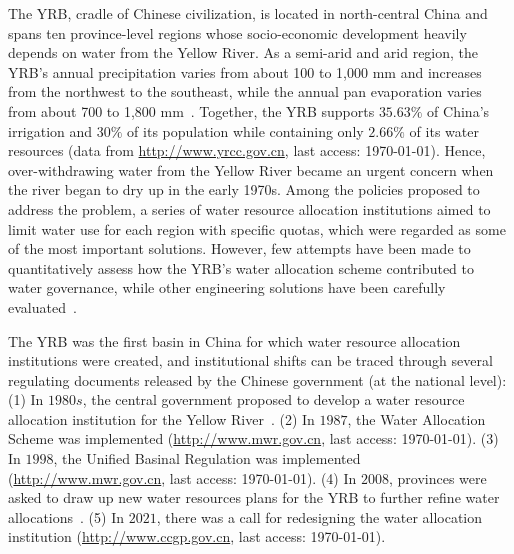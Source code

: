 
The YRB, cradle of Chinese civilization, is located in north-central China and spans ten province-level regions whose socio-economic development heavily depends on water from the Yellow River.
As a semi-arid and arid region, the YRB's annual precipitation varies from about 100 to 1,000 mm and increases from the northwest to the southeast, while the annual pan evaporation varies from about 700 to 1,800 mm~\cite{wang2022e}.
Together, the YRB supports $35.63\%$ of China's irrigation and $30\%$ of its population while containing only $2.66\%$ of its water resources (data from \href{http://www.yrcc.gov.cn}{http://www.yrcc.gov.cn}, last access: \today).
Hence, over-withdrawing water from the Yellow River became an urgent concern when the river began to dry up in the early 1970s.
Among the policies proposed to address the problem, a series of water resource allocation institutions aimed to limit water use for each region with specific quotas, which were regarded as some of the most important solutions.
However, few attempts have been made to quantitatively assess how the YRB's water allocation scheme contributed to water governance, while other engineering solutions have been carefully evaluated~\cite{long2020}.


The YRB was the first basin in China for which water resource allocation institutions were created, and institutional shifts can be traced through several regulating documents released by the Chinese government (at the national level):
(1) In $1980s$, the central government proposed to develop a water resource allocation institution for the Yellow River~\cite{wang2019d, wang2019e}.
(2) In $1987$, the Water Allocation Scheme was implemented (\href{http://www.gov.cn/zhengce/content/2011-03/30/content_3138.htm#}{http://www.mwr.gov.cn}, last access: \today).
(3) In $1998$, the Unified Basinal Regulation was implemented (\href{http://www.mwr.gov.cn/ztpd/2013ztbd/2013fxkh/fxkhswcbcs/cs/flfg/201304/t20130411_433489.html}{http://www.mwr.gov.cn}, last access: \today).
(4) In $2008$, provinces were asked to draw up new water resources plans for the YRB to further refine water allocations~\cite{wang2019d,wang2019e}.
(5) In $2021$, there was a call for redesigning the water allocation institution (\href{http://www.ccgp.gov.cn/cggg/zygg/gkzb/202107/t20210721_16591901.htm}{http://www.ccgp.gov.cn}, last access: \today).


